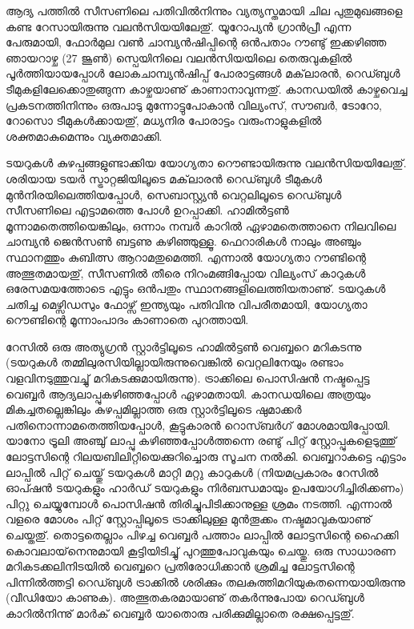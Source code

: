 ﻿
\vskip 2pt

ആദ്യ പത്തില്‍ സീസണിലെ പതിവില്‍നിന്നും വ്യത്യസ്തമായി ചില പുതുമുഖങ്ങളെ കണ്ട റേസായിരുന്നു വലന്‍സിയയിലേതു്. 
യൂറോപ്യന്‍ ഗ്രാന്‍പ്രീ എന്ന പേരുമായി, ഫോര്‍മുല വണ്‍ ചാമ്പ്യന്‍ഷിപ്പിന്റെ ഒന്‍പതാം റൗണ്ടു് ഇക്കഴിഞ്ഞ ഞായറാഴ്ച (27
ജൂണ്‍) സ്പെയിനിലെ വലന്‍സിയയിലെ തെരുവുകളില്‍ പൂര്‍ത്തിയായപ്പോള്‍ ലോകചാമ്പ്യന്‍ഷിപ്പ് പോരാട്ടങ്ങള്‍ മക്‌ലാരന്‍,
റെഡ്ബുള്‍ ടീമുകളിലേക്കൊതുങ്ങുന്ന കാഴ്ചയാണു് കാണാനാവുന്നതു്. കാനഡയില്‍ കാഴ്ചവെച്ച പ്രകടനത്തിനിന്നും 
ഒരുപാടു മുന്നോട്ടുപോകാന്‍ വില്യംസ്, സൗബര്‍, ടോറോ, റോസൊ ടീമുകള്‍ക്കായതു്, മധ്യനിര പോരാട്ടം വരുംനാളുകളില്‍
ശക്തമാകുമെന്നും വ്യക്തമാക്കി.

ടയറുകള്‍ കുഴപ്പങ്ങളുണ്ടാക്കിയ യോഗ്യതാ റൌണ്ടായിരുന്നു വലന്‍സിയയിലേതു്. ശരിയായ ടയര്‍ സ്ട്രാറ്റജിയിലൂടെ മക്‌ലാരന്‍
റെഡ്ബുള്‍ ടീമുകള്‍ മുന്‍നിരയിലെത്തിയപ്പോള്‍, സെബാസ്റ്റ്യന്‍ വെറ്റലിലൂടെ റെഡ്ബുള്‍ സീസണിലെ എട്ടാമത്തെ പോള്‍ 
ഉറപ്പാക്കി. ഹാമില്‍ട്ടണ്‍ മൂന്നാമതെത്തിയെങ്കിലും, ഒന്നാം നമ്പര്‍ കാറില്‍ ഏഴാമതെത്താനെ നിലവിലെ ചാമ്പ്യന്‍ ജെന്‍സണ്‍
ബട്ടണു കഴിഞ്ഞുള്ളൂ. ഫെറാരികള്‍ നാലും അഞ്ചും സ്ഥാനത്തും കുബിത്സ ആറാമതുമെത്തി. എന്നാല്‍ യോഗ്യതാ റൗണ്ടിന്റെ
അത്ഭുതമായതു്, സീസണില്‍ തീരെ നിറംമങ്ങിപ്പോയ വില്യംസ് കാറുകള്‍ ഒരേസമയത്തോടെ എട്ടും ഒന്‍പതും 
സ്ഥാനങ്ങളിലെത്തിയതാണു്. ടയറുകള്‍ ചതിച്ച മെഴ്സിഡസും ഫോഴ്സ് ഇന്ത്യയും പതിവിനു വിപരീതമായി, യോഗ്യതാ റൌണ്ടിന്റെ
മൂന്നാംപാദം കാണാതെ പുറത്തായി.

റേസില്‍ ഒരു അത്യുഗ്രന്‍ സ്റ്റാര്‍ട്ടിലൂടെ ഹാമില്‍ട്ടണ്‍ വെബ്ബറെ മറികടന്നു (ടയറുകള്‍ തമ്മിലുരസിയില്ലായിരുന്നുവെങ്കില്‍ 
വെറ്റലിനേയും രണ്ടാം വളവിനടുത്തുവച്ചു് മറികടക്കുമായിരുന്നു). ട്രാക്കിലെ പൊസിഷന്‍ നഷ്ടപ്പെട്ട വെബ്ബര്‍ 
ആദ്യലാപ്പുകഴിഞ്ഞപ്പോള്‍ ഏഴാമതായി. കാനഡയിലെ അത്രയും മികച്ചതല്ലെങ്കിലും കുഴപ്പമില്ലാത്ത ഒരു സ്റ്റാര്‍ട്ടിലൂടെ 
ഷുമാക്കര്‍ പതിനൊന്നാമതെത്തിയപ്പോള്‍, കൂട്ടുകാരന്‍ റൊസ്ബര്‍ഗ് മോശമായിപ്പോയി. യാനോ ട്രൂലി അഞ്ചു് ലാപ്പു 
കഴിഞ്ഞപ്പോള്‍ത്തന്നെ രണ്ടു് പിറ്റ് സ്റ്റോപ്പുകളെടുത്തു് ലോട്ടസിന്റെ റിലയബിലിറ്റിയെക്കുറിച്ചൊരു സൂചന നല്‍കി. 
വെബ്ബറാകട്ടെ എട്ടാം ലാപ്പില്‍ പിറ്റ് ചെയ്തു് ടയറുകള്‍ മാറ്റി മറ്റു കാറുകള്‍ (നിയമപ്രകാരം റേസില്‍ ഓപ്ഷന്‍ ടയറുകളും 
ഹാര്‍ഡ് ടയറുകളും നിര്‍ബന്ധമായും ഉപയോഗിച്ചിരിക്കണം) പിറ്റു ചെയ്യുമ്പോള്‍ പൊസിഷന്‍ തിരിച്ചുപിടിക്കാനുള്ള ശ്രമം 
നടത്തി. എന്നാല്‍ വളരെ മോശം പിറ്റ് സ്റ്റോപ്പിലൂടെ ട്രാക്കിലുള്ള മുന്‍തൂക്കം നഷ്ടമാവുകയാണു് ചെയ്തതു്. 
തൊട്ടതെല്ലാം പിഴച്ച വെബ്ബര്‍ പത്താം ലാപ്പില്‍ ലോട്ടസിന്റെ ഹൈക്കി കൊവലായ്‌നെനുമായി കൂട്ടിയിടിച്ചു് പുറത്തുപോവുകയും ചെയ്തു. 
ഒരു സാധാരണ മറികടക്കലിനിടയില്‍ വെബ്ബറെ പ്രതിരോധിക്കാന്‍ ശ്രമിച്ച ലോട്ടസിന്റെ പിന്നില്‍ത്തട്ടി 
റെഡ്ബുള്‍ ട്രാക്കില്‍ ശരിക്കും തലകുത്തിമറിയുകതന്നെയായിരുന്നു (വീഡിയോ കാണുക). അത്ഭുതകരമായാണു് 
തകര്‍ന്നുപോയ റെഡ്ബുള്‍ കാറില്‍നിന്നു് മാര്‍ക് വെബ്ബര്‍ യാതൊരു പരിക്കുമില്ലാതെ രക്ഷപ്പെട്ടതു്.

